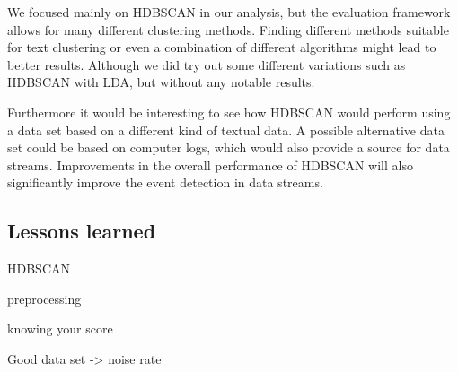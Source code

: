 We focused mainly on HDBSCAN in our analysis, but the evaluation framework allows for many different clustering methods.
Finding different methods suitable for text clustering
or even a combination of different algorithms might lead to better results.
Although we did try out some different variations such as HDBSCAN with LDA,
but without any notable results.

Furthermore it would be interesting to see how HDBSCAN would perform
using a data set based on a different kind of textual data.
A possible alternative data set could be based on computer logs,
which would also provide a source for data streams.
Improvements in the overall performance of HDBSCAN will also significantly improve the event detection in data streams.

\subsection{Lessons learned}

HDBSCAN

preprocessing


knowing your score


Good data set -> noise rate

